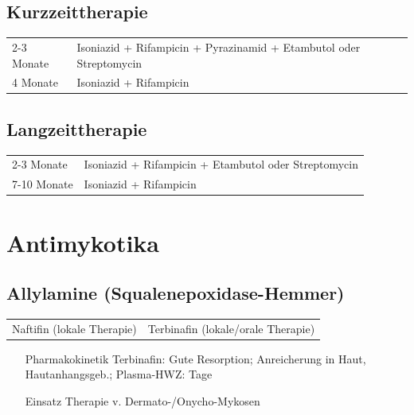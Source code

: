 \documentclass[10pt,a4paper]{report}
\begin{document}
\subsection{Kurzzeittherapie} %
\label{sub:kurzzeittherapie}
\begin{tabularx}{\textwidth}{lX}
2-3 Monate&Isoniazid + Rifampicin + Pyrazinamid + Etambutol oder Streptomycin\\
4 Monate&Isoniazid + Rifampicin\\
\end{tabularx}
\subsection{Langzeittherapie} %
\label{sub:langzeittherapie}
\begin{tabularx}{\textwidth}{lX}
2-3 Monate&Isoniazid + Rifampicin + Etambutol oder Streptomycin\\
7-10 Monate&Isoniazid + Rifampicin\\
\end{tabularx}
\section{Antimykotika} %
\label{sec:antimykotika}
\subsection{Allylamine (Squalenepoxidase-Hemmer)} %
\label{sub:allylamine_squalenepoxidase_hemmer_}
\begin{tabularx}{\textwidth}{XX}
Naftifin (lokale Therapie)&Terbinafin (lokale/orale Therapie)\\
\end{tabularx}
\begin{itemize}
	\item[Pharmakokinetik] Terbinafin: Gute Resorption; Anreicherung in Haut, Hautanhangsgeb.; Plasma-HWZ: Tage
	\item[Einsatz] Therapie v. Dermato-/Onycho-Mykosen
\end{itemize}
\end{document}
